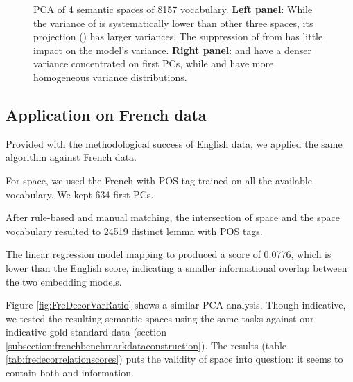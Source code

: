 \begin{figure}
    \centering
    \caption[EVR of 4 Semantic Spaces]{PCA of 4 semantic spaces of 8157 vocabulary. \textbf{Left panel}: While the variance of  is systematically lower than other three spaces, its projection () has larger variances. The suppression of  from  has little impact on the model's variance. \textbf{Right panel}:  and  have a denser variance concentrated on first PCs, while  and  have more homogeneous variance distributions.} 
    \label{fig:EngDecorVarRatio}
\end{figure}

\subsection{Application on French data}

Provided with the methodological success of English data, we applied the same algorithm against French data.

For  space, we used the French  with POS tag trained on all the available vocabulary. We kept 634 first PCs.

After rule-based and manual matching, the intersection of  space and the  space vocabulary resulted to 24519 distinct lemma with POS tags.

The linear regression model mapping  to  produced a  score of 0.0776, which is lower than the English score, indicating a smaller informational overlap between the two embedding models.

Figure \ref{fig:FreDecorVarRatio} shows a similar PCA analysis. Though indicative, we tested the resulting semantic spaces using the same tasks against our indicative gold-standard data (section \ref{subsection:frenchbenchmarkdataconstruction}). The results (table \ref{tab:fredecorrelationscores}) puts the validity of  space into question: it seems to contain both \similarity and \association information.

